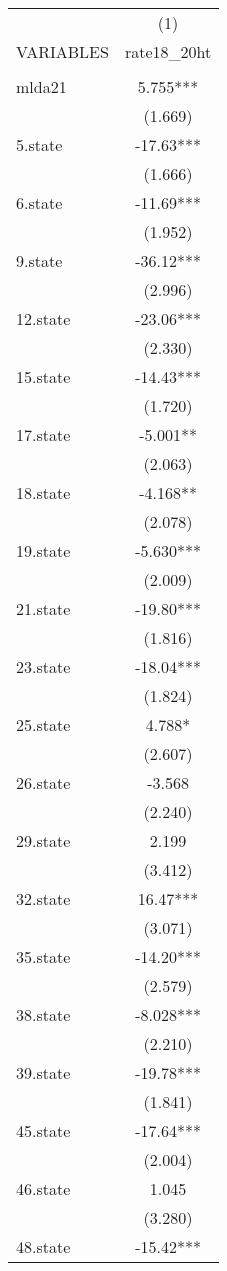 \begin{tabular}{lc} \hline
 & (1) \\
VARIABLES & rate18\_20ht \\ \hline
 &  \\
mlda21 & 5.755*** \\
 & (1.669) \\
5.state & -17.63*** \\
 & (1.666) \\
6.state & -11.69*** \\
 & (1.952) \\
9.state & -36.12*** \\
 & (2.996) \\
12.state & -23.06*** \\
 & (2.330) \\
15.state & -14.43*** \\
 & (1.720) \\
17.state & -5.001** \\
 & (2.063) \\
18.state & -4.168** \\
 & (2.078) \\
19.state & -5.630*** \\
 & (2.009) \\
21.state & -19.80*** \\
 & (1.816) \\
23.state & -18.04*** \\
 & (1.824) \\
25.state & 4.788* \\
 & (2.607) \\
26.state & -3.568 \\
 & (2.240) \\
29.state & 2.199 \\
 & (3.412) \\
32.state & 16.47*** \\
 & (3.071) \\
35.state & -14.20*** \\
 & (2.579) \\
38.state & -8.028*** \\
 & (2.210) \\
39.state & -19.78*** \\
 & (1.841) \\
45.state & -17.64*** \\
 & (2.004) \\
46.state & 1.045 \\
 & (3.280) \\
48.state & -15.42*** \\

\end{tabular}
